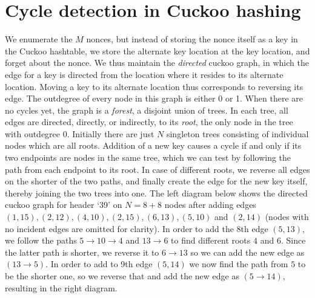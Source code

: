 \documentclass[11pt, oneside]{article}
\begin{document}
\section{Cycle detection in Cuckoo hashing}
We enumerate the $M$ nonces, but instead of storing the nonce itself as a key
in the Cuckoo hashtable, we store the alternate key location at the key
location, and forget about the nonce.  We thus maintain the {\em directed}
cuckoo graph, in which the edge for a key is directed from the location where
it resides to its alternate location.  Moving a key to its alternate location
thus corresponds to reversing its edge.  The outdegree of every node in this
graph is either 0 or 1.  When there are no cycles yet, the graph is a {\em
forest}, a disjoint union of trees.  In each tree, all edges are directed,
directly, or indirectly, to its {\em root}, the only node in the tree with
outdegree 0.  Initially there are just $N$ singleton trees consisting of
individual nodes which are all roots.
Addition of a new key causes a cycle if and only if its two endpoints are
nodes in the same tree, which we can test by following the path from each
endpoint to its root.
In case of different roots, we reverse all edges on the shorter of the two
paths, and finally create the edge for the new key itself, thereby joining
the two trees into one.
The left diagram below shows the directed cuckoo graph for header `39' on
$N=8+8$ nodes after adding edges
$(1,15),(2,12),(4,10),(2,15),(6,13),(5,10)$ and $(2,14)$ (nodes
with no incident edges are omitted for clarity).
In order to add the 8th edge $(5,13)$, we follow the paths $5 \rightarrow 10
\rightarrow 4$ and $13 \rightarrow 6$ to find different roots $4$ and $6$.
Since the latter path is shorter, we reverse it to $6 \rightarrow 13$ so we
can add the new edge as $(13 \rightarrow 5)$. In order to add to 9th edge
$(5,14)$ we now find the path from $5$ to be the shorter one, so we reverse
that and add the new edge as $(5 \rightarrow 14)$, resulting in the right diagram.
\end{document}
